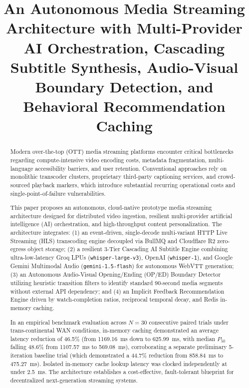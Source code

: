 \documentclass[conference]{IEEEtran}
\begin{document}
\title{An Autonomous Media Streaming Architecture with Multi-Provider AI Orchestration, Cascading Subtitle Synthesis, Audio-Visual Boundary Detection, and Behavioral Recommendation Caching}

\author{
}

\maketitle

\begin{abstract}
Modern over-the-top (OTT) media streaming platforms encounter critical bottlenecks regarding compute-intensive video encoding costs, metadata fragmentation, multi-language accessibility barriers, and user retention. Conventional approaches rely on monolithic transcoder clusters, proprietary third-party captioning services, and crowd-sourced playback markers, which introduce substantial recurring operational costs and single-point-of-failure vulnerabilities. 

This paper proposes an autonomous, cloud-native prototype media streaming architecture designed for distributed video ingestion, resilient multi-provider artificial intelligence (AI) orchestration, and high-throughput content personalization. The architecture integrates: (1) an event-driven, single-decode multi-variant HTTP Live Streaming (HLS) transcoding engine decoupled via BullMQ and Cloudflare R2 zero-egress object storage; (2) a resilient 3-Tier Cascading AI Subtitle Engine combining ultra-low-latency Groq LPUs (\texttt{whisper-large-v3}), OpenAI (\texttt{whisper-1}), and Google Gemini Multimodal Audio (\texttt{gemini-1.5-flash}) for autonomous WebVTT generation; (3) an Autonomous Audio-Visual Opening/Ending (OP/ED) Boundary Detector utilizing heuristic transition filters to identify standard 90-second media segments without external API dependency; and (4) an Implicit Feedback Recommendation Engine driven by watch-completion ratios, reciprocal temporal decay, and Redis in-memory caching.

In an empirical benchmark evaluation across $N = 30$ consecutive paired trials under trans-continental WAN conditions, in-memory caching demonstrated an average latency reduction of 46.5\% (from 1169.16~ms down to 625.99~ms, with median $P_{50}$ falling 48.6\% from 1107.57~ms to 569.08~ms), corroborating a separate preliminary 5-iteration baseline trial (which demonstrated a 44.7\% reduction from 858.84~ms to 475.27~ms). Isolated in-memory cache lookup latency was clocked independently at under 2.5~ms. The architecture establishes a cost-effective, fault-tolerant blueprint for decentralized next-generation streaming systems.
\end{abstract}
\end{document}
